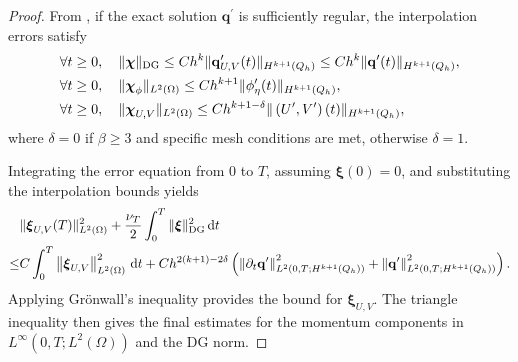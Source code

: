 \documentclass[pdflatex,sn-mathphys-num]{sn-jnl}%
\theoremstyle{thmstyleone}%
\theoremstyle{thmstyletwo}%
\theoremstyle{thmstylethree}%
\begin{document}
\begin{proof}
From \cite{ref_article2}, if the exact solution $\mathbf{q}^{\prime}$ is sufficiently regular, the interpolation errors satisfy
\begin{equation}\notag
\begin{aligned}
&\forall t \geq 0, \quad\|\boldsymbol{\chi}\|_{\mathrm{DG}} \leq C h^{k}\|\mathbf{q}^{\prime}_{U,V}(t)\|_{H^{k+1}\left(Q_h\right)}\leq C h^{k}\|\mathbf{q}^{\prime}(t)\|_{H^{k+1}\left(Q_h\right)}, \\
&\forall t \geq 0, \quad\|\boldsymbol{\chi}_{\phi}\|_{L^2(\Omega)} \leq C h^{k+1}\|\phi_\eta^{\prime}(t)\|_{H^{k+1}\left(Q_h\right)}, \\
&\forall t \geq 0, \quad\|\boldsymbol{\chi}_{U,V}\|_{L^2(\Omega)} \leq C h^{k+1-\delta}\|\left(U^\prime,V^\prime \right)(t)\|_{H^{k+1}\left(Q_h\right)},
\end{aligned}
\end{equation}
where $\delta=0$ if $\beta \ge 3$ and specific mesh conditions are met, otherwise $\delta=1$.

Integrating the error equation from $0$ to $T$, assuming $\boldsymbol{\xi}(0)=0$, and substituting the interpolation bounds yields
\begin{equation}\notag
\begin{aligned}
&\|\boldsymbol{\xi}_{U,V}(T)\|_{L^2(\Omega)}^2
+ \frac{\nu_T}{2}\int_0^T\|\boldsymbol{\xi}\|_{\mathrm{DG}}^2 \, \mathrm{d} t \\
\le& C \int_0^T\left\|\boldsymbol{\xi}_{U,V}\right\|^2_{L^2(\Omega)} \, \mathrm{d} t + Ch^{2(k+1)-2\delta}\left(\left\|\partial_t \mathbf{q}^\prime\right\|^2_{L^2(0,T;H^{k+1}(Q_h))} +
\left\|\mathbf{q}^\prime  \right\|^2_{L^2(0,T;H^{k+1}(Q_h))} \right).
\end{aligned}
\end{equation}
Applying Gr\"onwall's inequality provides the bound for $\boldsymbol{\xi}_{U,V}$. The triangle inequality then gives the final estimates for the momentum components in $L^\infty(0,T;L^2(\Omega))$ and the DG norm.


\end{proof}
\end{document}

